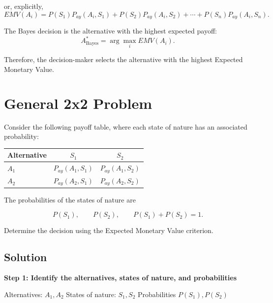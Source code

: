 	or, explicitly,
	$$
	EMV(A_i)
	=
	P(S_1)P_{ay}(A_i,S_1)
	+
	P(S_2)P_{ay}(A_i,S_2)
	+
	\cdots
	+
	P(S_n)P_{ay}(A_i,S_n).
	$$
	
	The Bayes decision is the alternative with the highest expected payoff:
	$$
	A^*_{\mathrm{Bayes}}
	=
	\arg\max_i EMV(A_i).
	$$
	
	Therefore, the decision-maker selects the alternative with the highest
	Expected Monetary Value.
	
	
	\section{General 2x2 Problem}
	
	Consider the following payoff table, where each state of nature has an
	associated probability:
	
	\begin{center}
		\renewcommand{\arraystretch}{1.3}
		\begin{tabular}{lcc}
			\toprule
			Alternative & $S_1$ & $S_2$ \\
			\midrule
			$A_1$
			& $P_{ay}(A_1,S_1)$
			& $P_{ay}(A_1,S_2)$ \\
			$A_2$
			& $P_{ay}(A_2,S_1)$
			& $P_{ay}(A_2,S_2)$ \\
			\bottomrule
		\end{tabular}
		
	\end{center}
	
	The probabilities of the states of nature are
	
	$$
	P(S_1),
	\qquad
	P(S_2),
	\qquad
	P(S_1)+P(S_2)=1.
	$$
	
	Determine the decision using the Expected Monetary Value criterion.
	
	
	\subsection{Solution}
	
	\textbf{Step 1: Identify the alternatives, states of nature, and probabilities}
	
	Alternatives: $A_1, A_2$ \qquad
	States of nature: $S_1, S_2$ \qquad
	Probabilities
	$
	P(S_1),
	P(S_2)
	$
	
